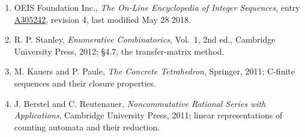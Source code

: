\documentclass[11pt]{article}
\theoremstyle{definition}
\begin{document}
\begin{enumerate}

\item OEIS Foundation Inc., \emph{The On-Line Encyclopedia of Integer Sequences}, entry \href{https://oeis.org/A305242}{A305242}, revision 4, last modified May 28 2018.

\item R. P. Stanley, \emph{Enumerative Combinatorics}, Vol.~1, 2nd ed., Cambridge University Press, 2012; \S4.7, the transfer-matrix method.

\item M. Kauers and P. Paule, \emph{The Concrete Tetrahedron}, Springer, 2011; C-finite sequences and their closure properties.

\item J. Berstel and C. Reutenauer, \emph{Noncommutative Rational Series with Applications}, Cambridge University Press, 2011; linear representations of counting automata and their reduction.

\end{enumerate}
\end{document}
